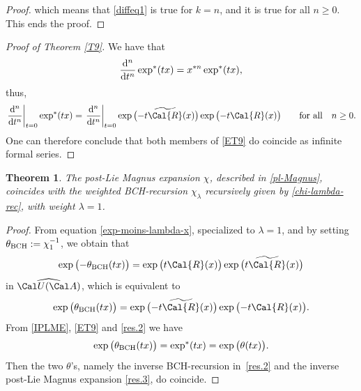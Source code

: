 \documentclass[10pt,a4paper]{amsart}
\numberwithin{equation}{section}
\newtheorem{Theorem}{Theorem}[section]
\begin{document}
\begin{proof}
{}

\noindent which means that \eqref{diffeq1} is true for $k=n$, and it is true for all $n \geq 0$. This ends the proof.
\end{proof}

\begin{proof}[Proof of Theorem \ref{T9}]
We have that
\begin{equation*}
\frac{{\rm d}^n}{{\rm d}t^n} \exp^{\ast}(tx) = x^{\ast n} \exp^{\ast}(tx),
\end{equation*}
thus,
\begin{equation*}
\left.\frac{{\rm d}^n}{{\rm d}t^n}\right\vert_{t=0} \exp^{\ast}(tx) = \left.\frac{{\rm d}^n}{{\rm d}t^n}\right\vert_{t=0} \exp\big({-}t \widetilde{\Cal{R}}(x)\big) \exp\big({-}t \Cal{R}(x)\big)\qquad \hbox{for all}\quad n\geq 0.
\end{equation*}
One can therefore conclude that both members of \eqref{ET9} do coincide as infinite formal series.
\end{proof}

\begin{Theorem}\label{main Theorem}
The post-Lie Magnus expansion $\chi$, described in \eqref{pl-Magnus}, coincides with the weighted BCH-recursion $\chi_{\lambda}$ recursively given by \eqref{chi-lambda-rec}, with weight $\lambda=1$.
\end{Theorem}



\begin{proof}
From equation \eqref{exp-moins-lambda-x}, specialized to $\lambda=1$, and by setting $\theta_{\rm BCH} :=\chi_{1}^{-1}$, we obtain that
\begin{displaymath}
\exp\big({-}\theta_{\rm BCH}(tx)\big)
= \exp\big(t \Cal{R}(x)\big) \exp\big(t \widetilde{\Cal{R}}(x)\big)
\end{displaymath}
in $\widehat{\Cal U(\Cal A)}$, which is equivalent to
\begin{equation}\label{res.2}
\exp\big(\theta_{\rm BCH}(tx)\big)
= \exp\big({-}t \widetilde{\Cal{R}}(x)\big) \exp\big({-}t \Cal{R}(x)\big).
\end{equation}
From \eqref{IPLME}, \eqref{ET9} and \eqref{res.2} we have
\begin{equation}\label{res.3}
\exp\big(\theta_{\rm BCH}(tx)\big) = \exp^{\ast}(tx)= \exp\big(\theta(tx)\big).
\end{equation}
Then the two $\theta$'s, namely the inverse BCH-recursion in~\eqref{res.2} and the inverse post-Lie Magnus expansion \eqref{res.3}, do coincide.
\end{proof}
\end{document}
